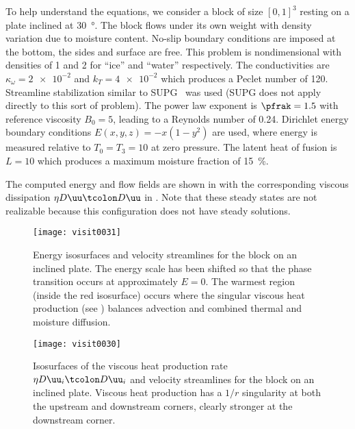 To help understand the equations, we consider a block of size $[0,1]^3$ resting on a plate inclined at \SI{30}{\degree}.
The block flows under its own weight with density variation due to moisture content.
No-slip boundary conditions are imposed at the bottom, the sides and surface are free.
This problem is nondimensional with densities of 1 and 2 for ``ice'' and ``water'' respectively.
The conductivities are $\kappa_\omega = \num{2e-2}$ and $k_T = \num{4e-2}$ which produces a Peclet number of 120.
Streamline stabilization similar to SUPG~\citep{brooks1982sup} was used (SUPG does not apply directly to this sort of problem).
The power law exponent is $\pfrak=1.5$ with reference viscosity $B_0 = 5$, leading to a Reynolds number of \num{0.24}.
Dirichlet energy boundary conditions $E(x,y,z) = -x (1-y^2)$ are used, where energy is measured relative to $T_0 = T_3 = 10$ at zero pressure.
The latent heat of fusion is $L=10$ which produces a maximum moisture fraction of \SI{15}{\percent}.

The computed energy and flow fields are shown in  with the corresponding viscous dissipation $\eta D\uu\tcolon D\uu$ in .
Note that these steady states are not realizable because this configuration does not have steady solutions.

\begin{figure}
  \centering\texttt{[image: visit0031]}
  \caption{Energy isosurfaces and velocity streamlines for the block on an inclined plate.
    The energy scale has been shifted so that the phase transition occurs at approximately $E=0$.
    The warmest region (inside the red isosurface) occurs where the singular viscous heat production (see ) balances advection and combined thermal and moisture diffusion.
  }\label{fig:vhtblock:energy}
\end{figure}

\begin{figure}
  \centering\texttt{[image: visit0030]}
  \caption{Isosurfaces of the viscous heat production rate $\eta D\uu_i\tcolon D\uu_i$ and velocity streamlines for the block on an inclined plate.
    Viscous heat production has a $1/r$ singularity at both the upstream and downstream corners, clearly stronger at the downstream corner.
  }\label{fig:vhtblock:sigma}
\end{figure}

